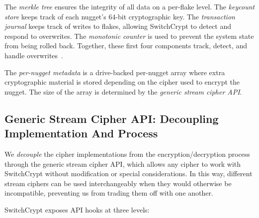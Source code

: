 The \emph{merkle tree} ensures the integrity of all data on a per-flake level.
The \emph{keycount store} keeps track of each nugget's 64-bit cryptographic key.
The \emph{transaction journal} keeps track of writes to flakes, allowing
SwitchCrypt to detect and respond to overwrites. The \emph{monotonic counter} is
used to prevent the system state from being rolled back. Together, these first
four components track, detect, and handle overwrites~\cite{StrongBox}.

The \emph{per-nugget metadata} is a drive-backed per-nugget array where extra
cryptographic material is stored depending on the cipher used to encrypt the
nugget. The size of the array is determined by the \emph{generic stream cipher
API}. 

\subsection{Generic Stream Cipher API: Decoupling Implementation And Process}

We \emph{decouple} the cipher implementations from the encryption/decryption
process through the generic stream cipher API, which allows any cipher to work
with SwitchCrypt without modification or special considerations. In this way,
different stream ciphers can be used interchangeably when they would otherwise
be incompatible, preventing us from trading them off with one another.

SwitchCrypt exposes API hooks at three levels:

